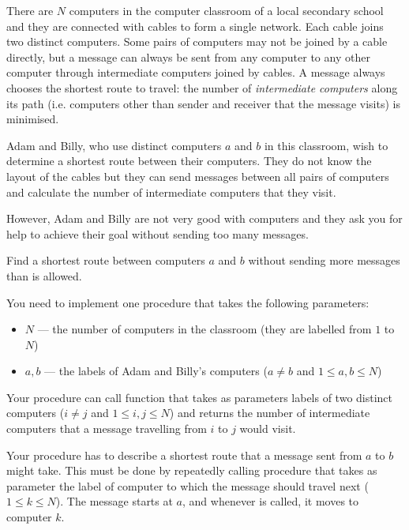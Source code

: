 \documentclass{boi2014}
\begin{document}
    There are $N$ computers in the computer classroom of a local secondary
    school and they are connected with cables to form a single network. Each
    cable joins two distinct computers.  Some pairs of computers may not be
    joined by a cable directly, but a message can always be sent from any
    computer to any other computer through intermediate computers joined by
    cables.  A message always chooses the shortest route to travel: the number
    of \emph{intermediate computers} along its path (i.e. computers other than
    sender and receiver that the message visits) is minimised.
    
    Adam and Billy, who use distinct computers $a$ and $b$ in this classroom,
    wish to determine a shortest route between their computers. They do not
    know the layout of the cables but they can send messages between all pairs
    of computers and calculate the number of intermediate computers that they
    visit.

    However, Adam and Billy are not very good with computers
    and they ask you for help to achieve their goal without sending
    too many messages.

    \Task
    Find a shortest route between computers $a$ and $b$ without
    sending more messages than is allowed.

    \Implementation
    You need to implement one procedure  that
    takes the following parameters:

    \begin{itemize}
        \item $N$ --- the number of computers in the classroom
            (they are labelled from $1$ to $N$)
        \item $a, b$ --- the labels of Adam and Billy's computers
            ($a \neq b$ and $1 \le a, b \le N$)
    \end{itemize}

    Your procedure  can call function 
    that takes as parameters labels of two distinct computers
    ($i \neq j$ and $1 \le i, j \le N$) and returns the number of intermediate computers
    that a message travelling from $i$ to $j$ would visit.

    Your procedure  has to describe a shortest route
    that a message sent from $a$ to $b$ might take. This must be done by
    repeatedly calling procedure  that takes as
    parameter the label of computer to which the message should travel
    next ($1 \le k \le N$). The message starts at $a$, and whenever
     is called, it moves to computer $k$.
\end{document}
